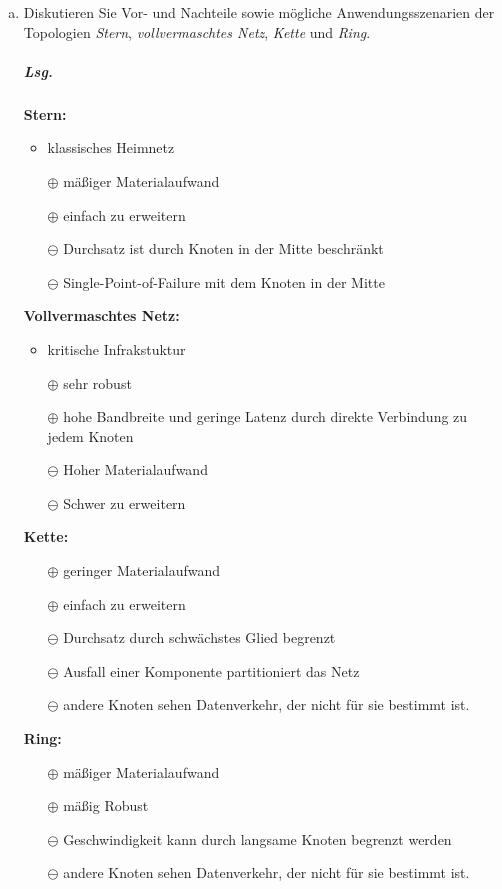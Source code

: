 \documentclass{scrreprt}
\begin{document}
\begin{enumerate}[(a)]
\item Diskutieren Sie Vor- und Nachteile sowie mögliche Anwendungsszenarien der
  Topologien \emph{Stern}, \emph{vollvermaschtes Netz}, \emph{Kette} und
  \emph{Ring}.

  \subparagraph{Lsg.} \textbf{Stern:}
  \begin{itemize}
  \item klassisches Heimnetz
  \item[$\oplus$] mäßiger Materialaufwand
  \item[$\oplus$] einfach zu erweitern
  \item[$\ominus$] Durchsatz ist durch Knoten in der Mitte beschränkt
  \item[$\ominus$] Single-Point-of-Failure mit dem Knoten in der Mitte
  \end{itemize}

  \textbf{Vollvermaschtes Netz:}
  \begin{itemize}
  \item kritische Infrakstuktur
  \item[$\oplus$] sehr robust
  \item[$\oplus$] hohe Bandbreite und geringe Latenz durch direkte Verbindung zu
    jedem Knoten
  \item[$\ominus$] Hoher Materialaufwand
  \item[$\ominus$] Schwer zu erweitern
  \end{itemize}

  \textbf{Kette:}
  \begin{itemize}
  \item[$\oplus$] geringer Materialaufwand
  \item[$\oplus$] einfach zu erweitern
  \item[$\ominus$] Durchsatz durch schwächstes Glied begrenzt
  \item[$\ominus$] Ausfall einer Komponente partitioniert das Netz
  \item[$\ominus$] andere Knoten sehen Datenverkehr, der nicht für sie
    bestimmt ist.
  \end{itemize}

  \textbf{Ring:}
  \begin{itemize}
  \item[$\oplus$] mäßiger Materialaufwand
  \item[$\oplus$] mäßig Robust
  \item[$\ominus$] Geschwindigkeit kann durch langsame Knoten begrenzt werden
  \item[$\ominus$] andere Knoten sehen Datenverkehr, der nicht für sie
    bestimmt ist.
  \end{itemize}
\end{enumerate}
\end{document}
